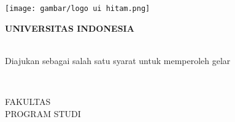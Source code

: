 \begin{titlepage}
    \begin{center}
        \texttt{[image: gambar/logo ui hitam.png]}
        
        \bfseries
        UNIVERSITAS INDONESIA

        \vspace{1cm}
        \large
        \MakeUppercase{\judul}

        \vfill
        
        \MakeUppercase{\jenis}\\

        \normalsize
        Diajukan sebagai salah satu syarat untuk memperoleh gelar \gelar

        \vspace{4cm}
        
        \MakeUppercase{\nama}\\
        \npm

        \vfill
        FAKULTAS \MakeUppercase{\fakultas}\\
        PROGRAM STUDI \MakeUppercase{\prodi}\\
        \MakeUppercase{\tempat}\\
        \MakeUppercase{\bulan} \tahun
    \end{center}
    \normalfont
\end{titlepage}